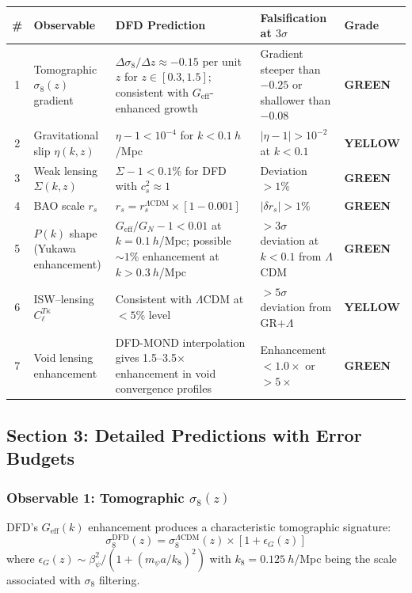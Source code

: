 \documentclass[11pt,a4paper]{article}
\newcommand{\GREEN}{\textcolor{dfdgreen}{\textbf{GREEN}}}
\newcommand{\YELLOW}{\textcolor{dfdyellow}{\textbf{YELLOW}}}
\begin{document}
\begin{center}
\begin{longtable}{clp{4cm}p{3cm}l}
\toprule
\textbf{\#} & \textbf{Observable} & \textbf{DFD Prediction} & \textbf{Falsification at $3\sigma$} & \textbf{Grade} \\
\midrule
\endhead
1 & Tomographic $\sigma_8(z)$ gradient & $\Delta\sigma_8 / \Delta z \approx -0.15$ per unit $z$ for $z \in [0.3, 1.5]$; consistent with $G_{\mathrm{eff}}$-enhanced growth & Gradient steeper than $-0.25$ or shallower than $-0.08$ & \GREEN \\
\midrule
2 & Gravitational slip $\eta(k,z)$ & $\eta - 1 < 10^{-4}$ for $k < 0.1~h$/Mpc & $|\eta - 1| > 10^{-2}$ at $k < 0.1$ & \YELLOW \\
\midrule
3 & Weak lensing $\Sigma(k,z)$ & $\Sigma - 1 < 0.1\%$ for DFD with $c_s^2 \approx 1$ & Deviation $> 1\%$ & \GREEN \\
\midrule
4 & BAO scale $r_s$ & $r_s = r_s^{\Lambda\mathrm{CDM}} \times [1 - 0.001]$ & $|\delta r_s| > 1\%$ & \GREEN \\
\midrule
5 & $P(k)$ shape (Yukawa enhancement) & $G_{\mathrm{eff}}/G_N - 1 < 0.01$ at $k = 0.1~h$/Mpc; possible $\sim 1\%$ enhancement at $k > 0.3~h$/Mpc & $> 3\sigma$ deviation at $k < 0.1$ from $\Lambda$CDM & \GREEN \\
\midrule
6 & ISW--lensing $C_\ell^{T\kappa}$ & Consistent with $\Lambda$CDM at $< 5\%$ level & $> 5\sigma$ deviation from GR$+\Lambda$ & \YELLOW \\
\midrule
7 & Void lensing enhancement & DFD-MOND interpolation gives 1.5--3.5$\times$ enhancement in void convergence profiles & Enhancement $< 1.0\times$ or $> 5\times$ & \GREEN \\
\bottomrule
\end{longtable}
\end{center}

\subsection{Section 3: Detailed Predictions with Error Budgets}

\subsubsection{Observable 1: Tomographic $\sigma_8(z)$}

DFD's $G_{\mathrm{eff}}(k)$ enhancement produces a characteristic tomographic signature:
\begin{equation}
\sigma_8^{\mathrm{DFD}}(z) = \sigma_8^{\Lambda\mathrm{CDM}}(z) \times \left[1 + \epsilon_G(z)\right]
\end{equation}
where $\epsilon_G(z) \sim \beta_\psi^2 / (1 + (m_\psi a/k_8)^2)$ with $k_8 = 0.125~h$/Mpc being the scale associated with $\sigma_8$ filtering.
\end{document}
